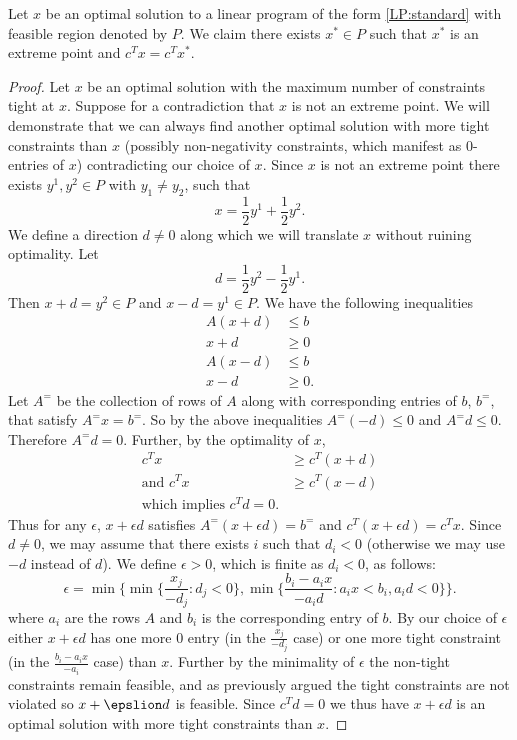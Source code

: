 \begin{lemma} Let $x$ be an optimal solution to a linear program of the form \ref{LP:standard} with feasible region denoted by $P$. We claim there exists $x^* \in P$ such that $x^*$ is an extreme point and $c^Tx = c^Tx^*$.
\end{lemma}
\begin{proof}
Let $x$ be an optimal solution with the maximum number of constraints tight at $x$. Suppose for a contradiction that $x$ is not an extreme point. We will demonstrate that we can always find another optimal solution with more tight constraints than $x$ (possibly non-negativity constraints, which manifest as $0$-entries of $x$) contradicting our choice of $x$. Since $x$ is not an extreme point there exists $y^1, y^2 \in P$ with $y_1 \neq y_2$, such that  $$x = \frac{1}{2} y^1 + \frac{1}{2}y^2.$$
We define a direction $d\neq 0$ along which we will translate $x$ without ruining optimality. Let
$$ d = \frac{1}{2}y^2 - \frac{1}{2} y^1.$$
Then $x + d = y^2 \in P$ and $x - d = y^1 \in P$. We have the following inequalities
\begin{align*} A(x+d) &\leq b \\ x+d &\geq 0 \\
A(x-d) &\leq b \\ x-d &\geq 0 .\end{align*}
Let $A^=$ be the collection of rows of $A$ along with corresponding entries of $b$, $b^=$, that satisfy $A^= x = b^=$. So by the above inequalities $A^=(-d) \leq 0$ and $A^=d \leq 0$. Therefore $A^=d = 0$. Further, by the optimality of $x$,
\begin{align*}
c^Tx &\geq c^T(x+d) \\
\text{and } c^Tx &\geq c^T(x-d) \\
\text{which implies } c^Td = 0.
\end{align*}
Thus for any $\epsilon$, $x+\epsilon d$ satisfies $A^=(x+\epsilon d) = b^=$ and $c^T(x+\epsilon d) = c^Tx$. Since $d \neq 0$, we may assume that there exists $i$ such that $d_i < 0$ (otherwise we may use $-d$ instead of $d$). We define $\epsilon > 0$, which is finite as $d_i < 0$, as follows:
$$ \epsilon = \min\{ \min\{\frac{x_j}{-d_j}: d_j < 0\}, \min \{\frac{b_i - a_i x }{-a_id}: a_i x < b_i, a_i d < 0 \}\}.$$
where $a_i$ are the rows $A$ and $b_i$ is the corresponding entry of $b$. By our choice of $\epsilon$ either $x+\epsilon d$ has one more $0$ entry (in the $\frac{x_j}{-d_j}$ case) or one more tight constraint (in the $\frac{b_i-a_i x}{-a_i}$ case) than $x$. Further by the minimality of $\epsilon$ the non-tight constraints remain feasible, and as previously argued the tight constraints are not violated so $x + \epslion d$ is feasible. Since $c^Td = 0$ we thus have $x + \epsilon d$ is an optimal solution with more tight constraints than $x$.
\end{proof}
